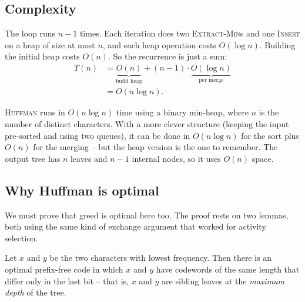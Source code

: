 \subsection{Complexity}

The loop runs $n-1$ times. Each iteration does two \textsc{Extract-Min}s and one
\textsc{Insert} on a heap of size at most $n$, and each heap operation costs
$O(\log n)$. Building the initial heap costs $O(n)$. So the recurrence is just a
sum:
\begin{align*}
  T(n) &= \underbrace{O(n)}_{\text{build heap}} + (n-1)\cdot \underbrace{O(\log n)}_{\text{per merge}} \\
       &= O(n \log n).
\end{align*}

\begin{complexitybox}
\textsc{Huffman} runs in $O(n \log n)$ time using a binary min-heap, where $n$ is
the number of distinct characters. With a more clever structure (keeping the
input pre-sorted and using two queues), it can be done in $O(n \log n)$ for the
sort plus $O(n)$ for the merging -- but the heap version is the one to remember.
The output tree has $n$ leaves and $n-1$ internal nodes, so it uses $O(n)$ space.
\end{complexitybox}

\subsection{Why Huffman is optimal}

We must prove that greed is optimal here too. The proof rests on two lemmas, both
using the same kind of exchange argument that worked for activity selection.

\begin{lemma}
\label{ch16:huffman-lemma1}
Let $x$ and $y$ be the two characters with lowest frequency. Then there is an
optimal prefix-free code in which $x$ and $y$ have codewords of the same length
that differ only in the last bit -- that is, $x$ and $y$ are sibling leaves at
the \emph{maximum depth} of the tree.
\end{lemma}


